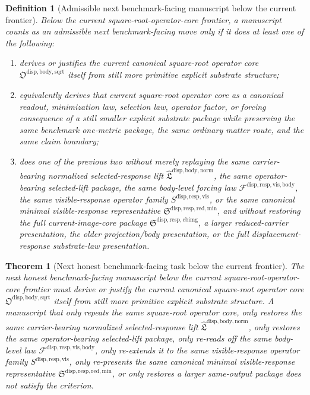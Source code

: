 \documentclass[11pt]{article}
\newcommand{\NormalizedLiftPackage}{\widehat{\mathfrak L}^{\mathrm{disp,body,norm}}}
\newcommand{\SquareRootOperatorCore}{\mathfrak O^{\mathrm{disp,body,sqrt}}}
\newcommand{\VisibleBodyForcingLaw}{\mathscr F^{\mathrm{disp,resp,vis,body}}}
\newcommand{\VisibleResponseOperator}{S^{\mathrm{disp,resp,vis}}}
\newcommand{\MinimalReducedStructure}{\mathfrak S^{\mathrm{disp,resp,red,min}}}
\newcommand{\CurrentBodyImageCore}{\mathfrak S^{\mathrm{disp,resp,cbimg}}}
\newtheorem{definition}{Definition}
\newtheorem{theorem}{Theorem}
\begin{document}
\begin{definition}[Admissible next benchmark-facing manuscript below the current frontier]
Below the current square-root-operator-core frontier, a manuscript counts as an admissible next benchmark-facing move only if it does at least one of the following:
\begin{enumerate}
    \item derives or justifies the current canonical square-root operator core \(\SquareRootOperatorCore\) itself from still more primitive explicit substrate structure;
    \item equivalently derives that current square-root operator core as a canonical readout, minimization law, selection law, operator factor, or forcing consequence of a still smaller explicit substrate package while preserving the same benchmark one-metric package, the same ordinary matter route, and the same claim boundary;
    \item does one of the previous two without merely replaying the same carrier-bearing normalized selected-response lift \(\NormalizedLiftPackage\), the same operator-bearing selected-lift package, the same body-level forcing law \(\VisibleBodyForcingLaw\), the same visible-response operator family \(\VisibleResponseOperator\), or the same canonical minimal visible-response representative \(\MinimalReducedStructure\), and without restoring the full current-image-core package \(\CurrentBodyImageCore\), a larger reduced-carrier presentation, the older projection/body presentation, or the full displacement-response substrate-law presentation.
\end{enumerate}
\end{definition}

\begin{theorem}[Next honest benchmark-facing task below the current frontier]
The next honest benchmark-facing manuscript below the current square-root-operator-core frontier must derive or justify the current canonical square-root operator core \(\SquareRootOperatorCore\) itself from still more primitive explicit substrate structure. A manuscript that only repeats the same square-root operator core, only restores the same carrier-bearing normalized selected-response lift \(\NormalizedLiftPackage\), only restores the same operator-bearing selected-lift package, only re-reads off the same body-level law \(\VisibleBodyForcingLaw\), only re-extends it to the same visible-response operator family \(\VisibleResponseOperator\), only re-presents the same canonical minimal visible-response representative \(\MinimalReducedStructure\), or only restores a larger same-output package does not satisfy the criterion.
\end{theorem}
\end{document}

